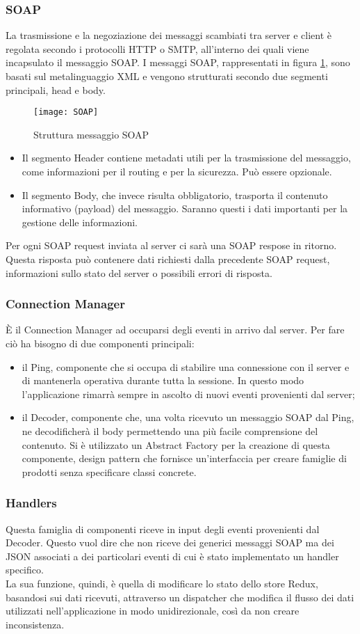 \subsubsection{SOAP}
La trasmissione e la negoziazione dei messaggi scambiati tra server e client è regolata secondo i protocolli HTTP o SMTP, all'interno dei quali viene incapsulato il messaggio SOAP.
I messaggi SOAP, rappresentati in figura \ref{fig:SOAP}, sono basati sul metalinguaggio XML e vengono strutturati secondo due segmenti principali, head e body. 
\begin{figure}[H] 
	\centering
	\texttt{[image: SOAP]}
	\caption{Struttura messaggio SOAP}
	\label{fig:SOAP}
\end{figure}
\begin{itemize}
	\item Il segmento Header contiene metadati utili per la trasmissione del messaggio, come informazioni per il routing e per la sicurezza. Può essere opzionale.
	\item Il segmento Body, che invece risulta obbligatorio, trasporta il contenuto informativo (payload) del messaggio. Saranno questi i dati importanti per la gestione delle informazioni.
\end{itemize}
Per ogni SOAP request inviata al server ci sarà una SOAP respose in ritorno. Questa risposta può contenere dati richiesti dalla precedente SOAP request, informazioni sullo stato del server o possibili errori di risposta.
\subsubsection{Connection Manager}
È il Connection Manager ad occuparsi degli eventi in arrivo dal server. Per fare ciò ha bisogno di due componenti principali:
\begin{itemize}
	\item il Ping, componente che si occupa di stabilire una connessione con il server e di mantenerla operativa durante tutta la sessione. In questo modo l'applicazione rimarrà sempre in ascolto di nuovi eventi provenienti dal server;
	\item il Decoder, componente che, una volta ricevuto un messaggio SOAP dal Ping, ne decodificherà il body permettendo una più facile comprensione del contenuto. Si è utilizzato un Abstract Factory per la creazione di questa componente, design pattern che fornisce un’interfaccia per creare famiglie di prodotti senza specificare classi concrete.
\end{itemize}
\subsubsection{Handlers}
Questa famiglia di componenti riceve in input degli eventi provenienti dal Decoder. Questo vuol dire che non riceve dei generici messaggi SOAP ma dei JSON associati a dei particolari eventi di cui è stato implementato un handler specifico.\\
La sua funzione, quindi, è quella di modificare lo stato dello store Redux, basandosi sui dati ricevuti, attraverso un dispatcher che modifica il flusso dei dati utilizzati nell'applicazione in modo unidirezionale, così da non creare inconsistenza.
